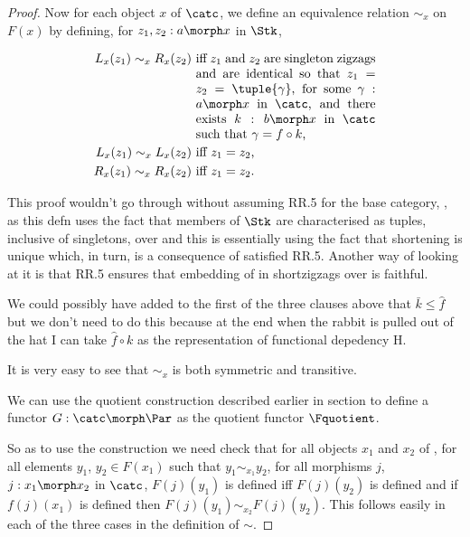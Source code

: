\begin{proof}
Now for each object $x$ of $\catc$, 
we define an equivalence relation $\sim_x$ on $F(x)$ by defining,
for $z_1,z_2:a \morph x$ in $\Stk$,

\begin{align*}
L_x(z_1) \sim_x R_x(z_2) & \mbox{ \parbox[t]{5cm}{ iff $z_1$ and $z_2$ are
                                      singleton zigzags and 
                                      are identical so that
                                      $z_1 = z_2 = \tuple{\gamma}$, 
                                      for some 
                                      $\gamma:a \morph x$ in $\catc$, 
                                      and there exists $k:b \morph x$ 
                                      in $\catc$ 
                                      such that $\gamma = f \circ k$,}}\\
L_x(z_1) \sim_x L_x(z_2) & \mbox{ iff $z_1 = z_2$,} \\
R_x(z_1) \sim_x R_x(z_2) & \mbox{ iff $z_1 = z_2$.} \\
\end{align*}


\begin{aside}
This proof wouldn't go through without 
assuming RR.5 for the base category, \catcw,
as this defn  uses the fact that members of $\Stk$ are characterised as tuples, inclusive of singletons, over \catcw and this is essentially using the fact that shortening is unique which, in turn, 
is a consequence of  \catcw satisfied RR.5. Another way of looking at it is that RR.5 ensures that embedding of \catcw in shortzigzags over \catcw is faithful.
\end{aside}
\begin{aside}
We could  possibly have added to the first of the three clauses above
that $\bar{k}\leq \widehat{f}$ but we don't need to do 
this because at the
end when the rabbit is pulled out of the hat I can take $\widehat{f} \circ k$ as the representation of functional depedency H.
\end{aside}

It is very easy to see that $\sim_x$  is both symmetric and transitive. 

We can use  the quotient construction described earlier
in section  
to define a functor
 $G: \catc \morph \Par$  as the quotient functor $\Fquotient$.

So as to use the construction we need check
that for all objects $x_1$ and $x_2$ of \catcw, 
for all elements $y_1$, $y_2 \in F(x_1)$ such that $y_1\!\sim_{x_1}\!\! y_2$, 
for all morphisms $j$, $j: x_1 \morph x_2$ in $\catc$,
$F(j)(y_1)$ is defined iff $F(j)(y_2)$ is defined 
and if $f(j)(x_1)$ is defined then $F(j)(y_1)\!\sim_{x_2}\!\!F(j)(y_2)$. 
This follows easily in each of the three cases 
in the definition of $\sim$.


\end{proof}
